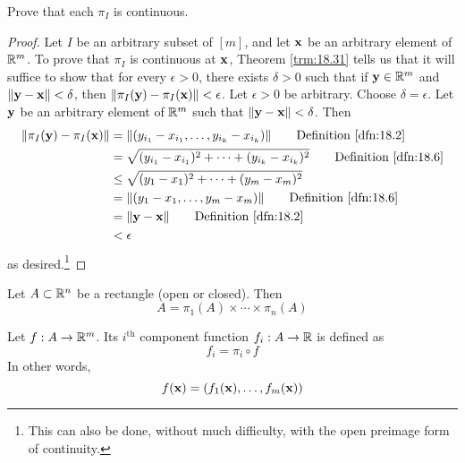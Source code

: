 \documentclass[../main.tex]{subfiles}
\begin{document}
\begin{exercise}\label{exr:18.35}
    Prove that each $\pi_I$ is continuous.
    \begin{proof}
        Let $I$ be an arbitrary subset of $[m]$, and let $\mathbf{x}$ be an arbitrary element of $\mathbb{R}^m$. To prove that $\pi_I$ is continuous at $\mathbf{x}$, Theorem \ref{trm:18.31} tells us that it will suffice to show that for every $\epsilon>0$, there exists $\delta>0$ such that if $\mathbf{y}\in\mathbb{R}^m$ and $\norm{\mathbf{y}-\mathbf{x}}<\delta$, then $\norm{\pi_I(\mathbf{y})-\pi_I(\mathbf{x})}<\epsilon$. Let $\epsilon>0$ be arbitrary. Choose $\delta=\epsilon$. Let $\mathbf{y}$ be an arbitrary element of $\mathbb{R}^m$ such that $\norm{\mathbf{y}-\mathbf{x}}<\delta$. Then
        \begin{align*}
            \norm{\pi_I(\y)-\pi_I(\x)} &= \norm{(y_{i_1}-x_{i_1},\dots,y_{i_k}-x_{i_k})}\tag*{Definition \ref{dfn:18.2}}\\
            &= \sqrt{(y_{i_1}-x_{i_1})^2+\cdots+(y_{i_k}-x_{i_k})^2}\tag*{Definition \ref{dfn:18.6}}\\
            &\leq \sqrt{(y_1-x_1)^2+\cdots+(y_m-x_m)^2}\\
            &= \norm{(y_1-x_1,\dots,y_m-x_m)}\tag*{Definition \ref{dfn:18.6}}\\
            &= \norm{\y-\x}\tag*{Definition \ref{dfn:18.2}}\\
            &< \epsilon
        \end{align*}
        as desired.\footnote{This can also be done, without much difficulty, with the open preimage form of continuity.}
    \end{proof}
\end{exercise}

\begin{remark}\label{rmk:18.36}
    Let $A\subset\mathbb{R}^n$ be a rectangle (open or closed). Then
    \begin{equation*}
        A = \pi_1(A)\times\cdots\times\pi_n(A)
    \end{equation*}
\end{remark}

\begin{definition}\label{dfn:18.37}
    Let $f:A\to\mathbb{R}^m$. Its $i^\text{th}$ component function $f_i:A\to\mathbb{R}$ is defined as
    \begin{equation*}
        f_i = \pi_i\circ f
    \end{equation*}
    In other words,
    \begin{equation*}
        f(\mathbf{x}) = (f_1(\mathbf{x}),\dots,f_m(\mathbf{x}))
    \end{equation*}
\end{definition}
\end{document}
